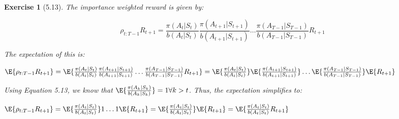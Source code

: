 \documentclass[a4paper]{scrartcl}
\theoremstyle{nonumberplain}
\newtheorem{ex}{Exercise}
\begin{document}
\begin{ex}[5.13]
The importance weighted reward is given by:

\begin{equation}
\rho_{t:T-1} R_{t+1}= \frac{\pi(A_t|S_t)}{b(A_t|S_t)}  \frac{\pi(A_{t+1}|S_{t+1})}{b(A_{t+1}|S_{t+1})} \dots \frac{\pi(A_{T-1}|S_{T-1})}{b(A_{T-1}|S_{T-1})} R_{t+1}
\end{equation}

The expectation of this is:

\begin{math}
\E{\rho_{t:T-1} R_{t+1}}= \E{\frac{\pi(A_t|S_t)}{b(A_t|S_t)}  \frac{\pi(A_{t+1}|S_{t+1})}{b(A_{t+1}|S_{t+1})} \dots \frac{\pi(A_{T-1}|S_{T-1})}{b(A_{T-1}|S_{T-1})} R_{t+1}}\\
=\E{\frac{\pi(A_t|S_t)}{b(A_t|S_t)}} \E{\frac{\pi(A_{t+1}|S_{t+1})}{b(A_{t+1}|S_{t+1})}} \dots \E{\frac{\pi(A_{T-1}|S_{T-1})}{b(A_{T-1}|S_{T-1})}} \E{R_{t+1}}
\end{math}

Using Equation 5.13, we know that $\E{\frac{\pi(A_k|S_k)}{b(A_k|S_k)}}=1 \forall k > t$. Thus, the expectation simplifies to:

\begin{math}
\E{\rho_{t:T-1} R_{t+1}}=\E{\frac{\pi(A_t|S_t)}{b(A_t|S_t)}} 1 \dots 1 \E{R_{t+1}}=\E{\frac{\pi(A_t|S_t)}{b(A_t|S_t)}}\E{R_{t+1}}=\E{\frac{\pi(A_t|S_t)}{b(A_t|S_t)} R_{t+1}}
\end{math}

\end{ex}
\end{document}
